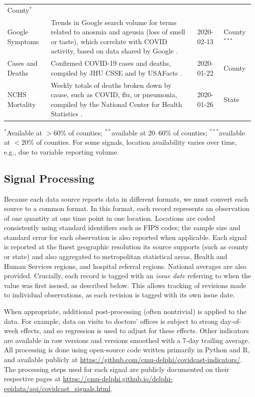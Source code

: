 \documentclass[11pt]{article}
\begin{document}
\begin{landscape}
\begin{table}[t]
\begin{tabular}{>{\raggedright}p{1.2in} p{4.0in} l >{\raggedright\arraybackslash}p{0.5in}}
County$^*$ \\
  Google Symptoms & Trends in Google search volume for terms related to
anosmia and ageusia (loss of smell or taste), which correlate with COVID
activity, based on data shared by Google \cite{GoogleSymptoms}. & 2020-02-13 &
County$^{***}$ \\
  Cases and Deaths & Confirmed COVID-19 cases and deaths, compiled by JHU CSSE
\cite{Dong:2020} and by USAFacts \cite{USAFacts}. & 2020-01-22 & County \\
    NCHS Mortality & Weekly totals of deaths broken down by cause, such as
COVID, flu, or pneumonia, compiled by the National Center for Health Statistics
\cite{NCHS}. & 2020-01-26 & State \\
  \bottomrule
\end{tabular}
{\raggedright $^*$Available at $>60$\% of counties; $^{**}$available at
  20--60\% of counties; $^{***}$available at $<20$\% of counties.  For some
  signals, location availability varies over time, e.g., due to variable
  reporting volume.}
\label{tab:sources_signals}
\end{table}
\end{landscape}

\subsection{Signal Processing}

Because each data source reports data in different formats, we must convert each
source to a common format. In this format, each record represents an observation
of one quantity at one time point in one location. Locations are coded
consistently using standard identifiers such as FIPS codes; the sample size and
standard error for each observation is also reported when applicable. Each
signal is reported at the finest geographic resolution its source supports (such
as county or state) and also aggregated to metropolitan statistical areas,
Health and Human Services regions, and hospital referral regions. National
averages are also provided. Crucially, each record is tagged with an
\textit{issue date} referring to when the value was first issued, as described
below. This allows tracking of revisions made to individual observations, as
each revision is tagged with its own issue date.

When appropriate, additional post-processing (often nontrivial) is applied to
the data. For example, data on visits to doctors' offices is subject to strong
day-of-week effects, and so regression is used to adjust for these effects.
Other indicators are available in raw versions and versions smoothed with a
7-day trailing average. All processing is done using open-source code written
primarily in Python and R, and available publicly at
\url{https://github.com/cmu-delphi/covidcast-indicators/}. The processing steps
used for each signal are publicly documented on their respective pages at
\url{https://cmu-delphi.github.io/delphi-epidata/api/covidcast_signals.html}.
\end{document}
